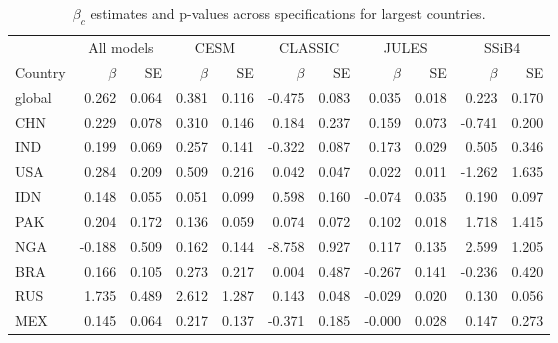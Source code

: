 \begin{table}[ht]
\centering
\caption{$\beta_c$ estimates and p-values across specifications for largest countries.} 
\label{tab:beta_select}
\begin{tabular}{lrrrrrrrrrr}
  \toprule
   & \multicolumn{2}{c}{All models} & \multicolumn{2}{c}{CESM} & \multicolumn{2}{c}{CLASSIC} & \multicolumn{2}{c}{JULES} & \multicolumn{2}{c}{SSiB4} \\
\cmidrule(lr){2-3}\cmidrule(lr){4-5}\cmidrule(lr){6-7}\cmidrule(lr){8-9}\cmidrule(lr){10-11}
Country & $\beta$ & SE & $\beta$ & SE & $\beta$ & SE & $\beta$ & SE & $\beta$ & SE \\
\midrule
 \midrule
global & 0.262 & 0.064 & 0.381 & 0.116 & -0.475 & 0.083 & 0.035 & 0.018 & 0.223 & 0.170 \\ 
  CHN & 0.229 & 0.078 & 0.310 & 0.146 & 0.184 & 0.237 & 0.159 & 0.073 & -0.741 & 0.200 \\ 
  IND & 0.199 & 0.069 & 0.257 & 0.141 & -0.322 & 0.087 & 0.173 & 0.029 & 0.505 & 0.346 \\ 
  USA & 0.284 & 0.209 & 0.509 & 0.216 & 0.042 & 0.047 & 0.022 & 0.011 & -1.262 & 1.635 \\ 
  IDN & 0.148 & 0.055 & 0.051 & 0.099 & 0.598 & 0.160 & -0.074 & 0.035 & 0.190 & 0.097 \\ 
  PAK & 0.204 & 0.172 & 0.136 & 0.059 & 0.074 & 0.072 & 0.102 & 0.018 & 1.718 & 1.415 \\ 
  NGA & -0.188 & 0.509 & 0.162 & 0.144 & -8.758 & 0.927 & 0.117 & 0.135 & 2.599 & 1.205 \\ 
  BRA & 0.166 & 0.105 & 0.273 & 0.217 & 0.004 & 0.487 & -0.267 & 0.141 & -0.236 & 0.420 \\ 
  RUS & 1.735 & 0.489 & 2.612 & 1.287 & 0.143 & 0.048 & -0.029 & 0.020 & 0.130 & 0.056 \\ 
  MEX & 0.145 & 0.064 & 0.217 & 0.137 & -0.371 & 0.185 & -0.000 & 0.028 & 0.147 & 0.273 \\ 
   \bottomrule
\end{tabular}
\end{table}

